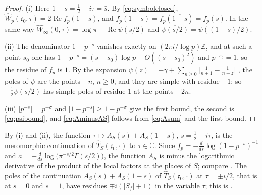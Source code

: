 \documentclass[11pt]{amsart}
\theoremstyle{remark}
\numberwithin{equation}{section}
\newcommand{\C}{\mathbb C}
\newcommand{\Z}{\mathbb Z}
\newcommand{\Rel}{\operatorname{Re}}
\newcommand{\cz}{\mathfrak c_0}
\begin{document}
\begin{proof}
(i) Here $1-s=\tfrac12-i\tau=\bar s$.  By \eqref{eq:symbolclosed},
$\widehat W_p(\cz,\tau)=2\Rel f_p(1-s)$, and
$\overline{f_p(1-s)}=f_p(\overline{1-s})=f_p(s)$.  In the same way
$\widehat W_\infty(0,\tau)=\log\pi-\Rel\psi(s/2)$ and
$\overline{\psi(s/2)}=\psi((1-s)/2)$.

(ii) The denominator $1-p^{-s}$ vanishes exactly on $(2\pi i/\log p)\Z$, and
at such a point $s_0$ one has $1-p^{-s}=(s-s_0)\log p+O((s-s_0)^2)$ and
$p^{-s_0}=1$, so the residue of $f_p$ is $1$.  By the expansion
$\psi(z)=-\gamma+\sum_{n\ge0}\bigl[\frac1{n+1}-\frac1{n+z}\bigr]$
\cite[(5.7.6)]{NIST}, the poles of $\psi$ are the points $-n$, $n\ge0$, and
they are simple with residue $-1$; so $-\tfrac12\psi(s/2)$ has simple poles
of residue $1$ at the points $-2n$.

(iii) $|p^{-s}|=p^{-\sigma}$ and $|1-p^{-s}|\ge1-p^{-\sigma}$ give the first
bound, the second is \eqref{eq:psibound}, and \eqref{eq:AminusAS} follows
from \eqref{eq:Asum} and the first bound.
\end{proof}

By (i) and (ii), the function $\tau\mapsto A_S(s)+A_S(1-s)$,
$s=\tfrac12+i\tau$, is the meromorphic continuation of
$\widehat T_S(\cz,\cdot)$ to $\tau\in\C$.  Since
$f_p=-\frac{d}{ds}\log(1-p^{-s})^{-1}$ and
$a=-\frac{d}{ds}\log\bigl(\pi^{-s/2}\Gamma(s/2)\bigr)$, the function $A_S$ is
minus the logarithmic derivative of the product of the local factors at the
places of $S$; compare \cite{BurnolCR,BurnolConductor}.  The poles of the
continuation $A_S(s)+A_S(1-s)$ of $\widehat T_S(\cz,\cdot)$ at
$\tau=\pm i/2$, that is at $s=0$ and $s=1$, have residues
$\mp i(|S_f|+1)$ in the variable $\tau$; this is
\cite[Theorem~5.13(c)]{P43}.
\end{document}
